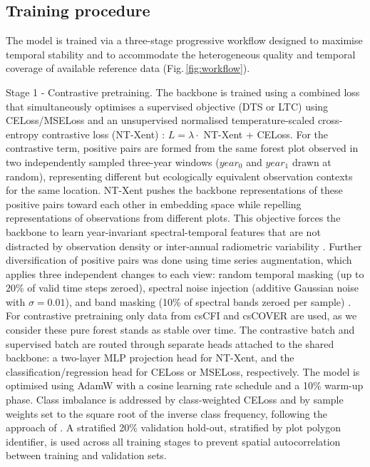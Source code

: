 \documentclass[essd, manuscript]{copernicus}
\begin{document}
\subsection{Training procedure}

The model is trained via a three-stage progressive workflow designed to maximise temporal stability and to accommodate the heterogeneous quality and temporal coverage of available reference data (Fig.\,\ref{fig:workflow}). 

Stage 1 - Contrastive pretraining. The backbone is trained using a combined loss that simultaneously optimises a supervised objective (DTS or LTC) using CELoss/MSELoss and an unsupervised normalised temperature-scaled cross-entropy contrastive loss (NT-Xent) \citep{chen_simple_2020}: $L = \lambda \cdot$ NT-Xent + CELoss. For the contrastive term, positive pairs are formed from the same forest plot observed in two independently sampled three-year windows ($year_0$ and $year_1$ drawn at random), representing different but ecologically equivalent observation contexts for the same location. NT-Xent pushes the backbone representations of these positive pairs toward each other in embedding space while repelling representations of observations from different plots. This objective forces the backbone to learn year-invariant spectral-temporal features that are not distracted by observation density or inter-annual radiometric variability \citep{manas_seasonal_2021}. Further diversification of positive pairs was done using time series augmentation, which applies three independent changes to each view: random temporal masking (up to 20\% of valid time steps zeroed), spectral noise injection (additive Gaussian noise with $\sigma=0.01$), and band masking (10\% of spectral bands zeroed per sample) \citep{yuan_empirical_2025}. For contrastive pretraining only data from csCFI and csCOVER are used, as we consider these pure forest stands as stable over time. The contrastive batch and supervised batch are routed through separate heads attached to the shared backbone: a two-layer MLP projection head for NT-Xent, and the classification/regression head for CELoss or MSELoss, respectively. The model is optimised using AdamW with a cosine learning rate schedule and a 10\% warm-up phase. Class imbalance is addressed by class-weighted CELoss and by sample weights set to the square root of the inverse class frequency, following the approach of \citet{grabska-szwagrzyk_map_2024}. A stratified 20\% validation hold-out, stratified by plot polygon identifier, is used across all training stages to prevent spatial autocorrelation between training and validation sets.
\end{document}
